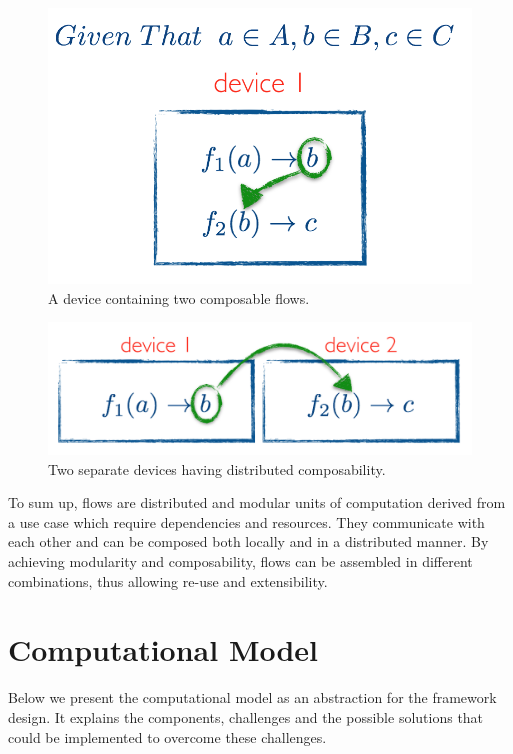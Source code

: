 \begin{figure}[H]
	\centering
	\includegraphics[scale=0.5]{images/local-compose.png} 
 	\caption{A device containing two composable flows.}
	\label{fig:compose}
\end{figure}
\begin{figure}[H]
	\centering
	\includegraphics[scale=0.5]{images/distributed-compose.png}
	\caption{Two separate devices having distributed composability.}
	\label{fig:compose2}
\end{figure}

\noindent To sum up, flows are distributed and modular units of computation derived from a use case which require dependencies and resources. They communicate with each other and can be composed both locally and in a distributed manner. By achieving  modularity and composability, flows can be assembled in different combinations, thus allowing re-use and extensibility.
\newpage
\section{Computational Model}

Below we present the computational model as an abstraction for the framework design. It explains the components, challenges and the possible solutions that could be implemented to overcome these challenges. 	

